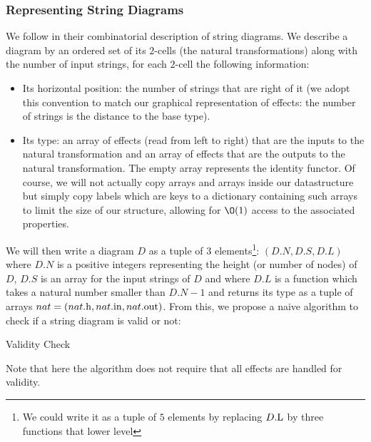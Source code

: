 \subsubsection{Representing String Diagrams}
We follow  in their combinatorial description
of string diagrams. We describe a diagram by an ordered set of its $2$-cells (the natural
transformations) along with the number of input strings, for each $2$-cell the following
information:
\begin{itemize}
	\item Its horizontal position: the number of strings that are right of it (we adopt this
	      convention to match our graphical representation of effects: the number of strings
	      is the distance to the base type).
	\item Its type: an array of effects (read from left to right) that are the inputs to the
	      natural transformation and an array of effects that are the outputs to the natural
	      transformation. The empty array represents the identity functor.
	      Of course, we will not actually copy arrays and arrays inside our datastructure but
	      simply copy labels which are keys to a dictionary containing such arrays to limit
	      the size of our structure, allowing for $\O(1)$ access to the associated properties.
\end{itemize}
We will then write a diagram $D$ as a tuple of $3$ elements\footnote{We could write it
	as a tuple of $5$ elements by replacing $D\mathrm{.L}$ by three functions that lower level}:
$\left( D.N, D.S, D.L \right)$ where $D.N$ is a positive integers representing the
height (or number of nodes) of $D$, $D.S$ is an array for the input strings of $D$ and
where $D.L$ is a function which takes a natural number smaller than $D.N - 1$ and
returns its type as a tuple of arrays
$nat = \left( nat\mathrm{.h}, nat\mathrm{.in}, nat\mathrm{.out} \right)$.
From this, we propose a naive algorithm to check if a string diagram is valid or not:
\begin{algorithm}[h]
	\caption{Validity Check}
	\begin{algorithmic}
		\EndIf
		\EndFor
		\EndFunction
	\end{algorithmic}
\end{algorithm}
Note that here the algorithm does not require that all effects are handled for validity.

